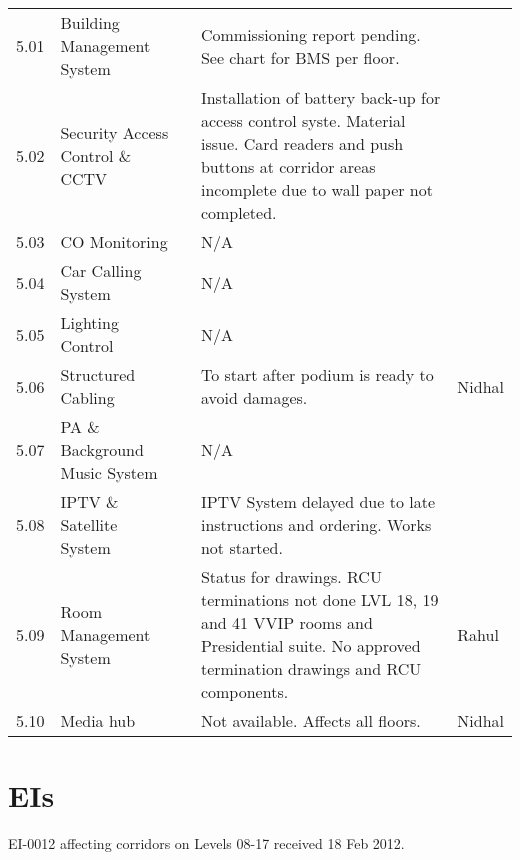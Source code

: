 \begin{fullwidth}
\begin{longtable}{@{}lp{3.5cm}@{}lp{5cm}p{1.5cm}}
5.01	&Building Management System	&& Commissioning report pending. See chart for BMS per floor.& \\	


5.02	&Security Access Control \& CCTV	&&Installation of battery back-up for access control syste. Material issue. Card readers and push buttons at corridor areas incomplete due to wall paper not completed.&\\	

5.03	&CO Monitoring		&&N/A&\\

5.04	&Car Calling System		&&N/A&\\

5.05	&Lighting Control		&&N/A&\\

5.06	&Structured Cabling		&&To start after podium is ready to avoid damages.& Nidhal\\

5.07	&PA \& Background Music System &&N/A&\\
	
5.08	&IPTV \& Satellite System	&&IPTV System delayed due to late instructions and ordering. Works not started.&\\	

5.09	&Room Management System	&&Status for drawings. RCU terminations not done LVL 18, 19 and 41 VVIP rooms and Presidential suite. No approved termination drawings and RCU components.&Rahul\\

5.10 &Media hub && Not available. Affects all floors.&Nidhal \\

\bottomrule
\end{longtable}
\end{fullwidth}

\section{EIs}

EI-0012 affecting corridors on Levels 08-17 received 18 Feb 2012. 


















